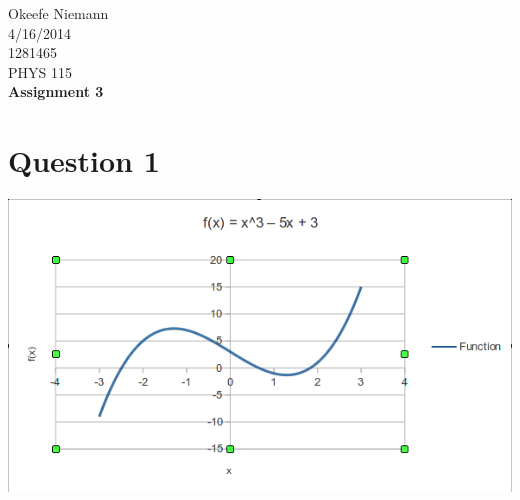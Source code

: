 \documentclass[10pt]{article}
\begin{document}
 
\begin{center}
\large
\hfill Okeefe Niemann\\
\hfill 4/16/2014\\
\hfill 1281465\\
\hfill PHYS 115 \\
\LARGE \textbf{Assignment 3}\\
\end{center}
\normalsize
\section{Question 1}
\begin{center}
\includegraphics[scale=.7]{PHYS115week3graph}
\end{center}
\end{document}
